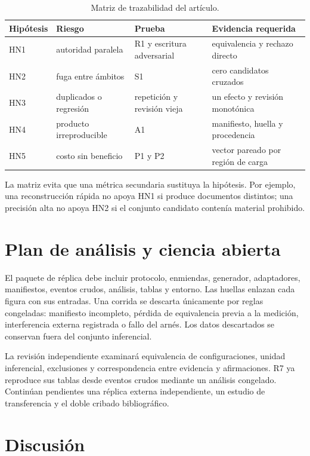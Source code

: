 \documentclass[12pt]{article}
\begin{document}
\begin{table}[H]\centering
\caption{Matriz de trazabilidad del artículo.}
\begin{tabularx}{\textwidth}{p{1.7cm}p{3.1cm}p{3.2cm}X}\toprule
Hipótesis & Riesgo & Prueba & Evidencia requerida\\\midrule
HN1 & autoridad paralela & R1 y escritura adversarial & equivalencia y rechazo directo\\
HN2 & fuga entre ámbitos & S1 & cero candidatos cruzados\\
HN3 & duplicados o regresión & repetición y revisión vieja & un efecto y revisión monotónica\\
HN4 & producto irreproducible & A1 & manifiesto, huella y procedencia\\
HN5 & costo sin beneficio & P1 y P2 & vector pareado por región de carga\\
\bottomrule\end{tabularx}\end{table}

La matriz evita que una métrica secundaria sustituya la hipótesis. Por ejemplo, una
reconstrucción rápida no apoya HN1 si produce documentos distintos; una precisión alta
no apoya HN2 si el conjunto candidato contenía material prohibido.

\section{Plan de análisis y ciencia abierta}

\COBRIAAnalisisSeparado

El paquete de réplica debe incluir protocolo, enmiendas, generador, adaptadores,
manifiestos, eventos crudos, análisis, tablas y entorno. Las huellas enlazan cada figura
con sus entradas. Una corrida se descarta únicamente por reglas congeladas: manifiesto
incompleto, pérdida de equivalencia previa a la medición, interferencia externa registrada
o fallo del arnés. Los datos descartados se conservan fuera del conjunto inferencial.

La revisión independiente examinará equivalencia de configuraciones, unidad inferencial,
exclusiones y correspondencia entre evidencia y afirmaciones. R7 ya reproduce sus tablas
desde eventos crudos mediante un análisis congelado. Continúan pendientes una réplica
externa independiente, un estudio de transferencia y el doble cribado bibliográfico.

\section{Discusión}
\end{document}
